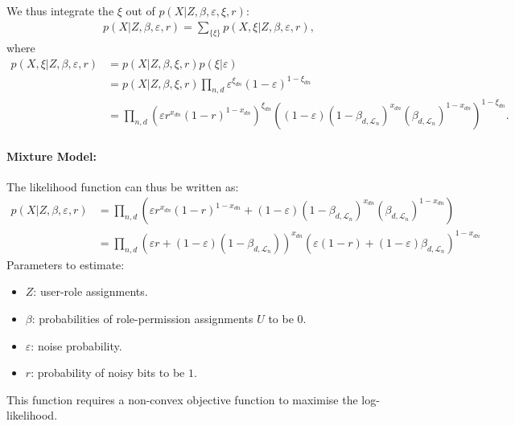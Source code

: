 We thus integrate the $\xi$ out of $p(X|Z,\beta, \varepsilon, \xi, r)$:
\begin{align*}
    p(X|Z,\beta,\varepsilon,r) = \sum_{\{\xi\}} p(X,\xi|Z,\beta, \varepsilon,r),
\end{align*}
where
\begin{align*}
    p(X,\xi|Z,\beta, \varepsilon, r) &=
        p(X|Z,\beta,\xi, r)p(\xi|\varepsilon)\\
        &= p(X|Z,\beta,\xi, r)\prod_{n,d}\varepsilon^{\xi_{dn}} (1-\varepsilon)^{1-\xi_{dn}}\\
        &= \prod_{n,d} \left(\varepsilon r^{x_{dn}} (1-r)^{1-x_{dn}}\right)^{\xi_{dn}}
            \left((1-\varepsilon)(1-\beta_{d,\mathcal L_n})^{x_{dn}}(\beta_{d,\mathcal L_n})^{1-x_{dn}}\right)^{1-\xi_{dn}}.
\end{align*}

\paragraph{Mixture Model:}
The likelihood function can thus be written as:
\begin{align*}
    p(X|Z,\beta,\varepsilon,r) &=
        \prod_{n,d} \left( \varepsilon r^{x_{dn}} (1-r)^{1-x_{dn}}+(1-\varepsilon)(1-\beta_{d,\mathcal L_n})^{x_{dn}} (\beta_{d,\mathcal L_n})^{1-x_{dn}} \right)\\
        &=  \prod_{n,d} \left(\varepsilon r + (1-\varepsilon)(1-\beta_{d,\mathcal L_n})\right)^{x_{dn}}
        \left(\varepsilon (1-r)+(1-\varepsilon)\beta_{d,\mathcal L_n}\right)^{1-x_{dn}}
\end{align*}
Parameters to estimate:
\begin{itemize}
    \item $Z$: user-role assignments.
    \item $\beta$: probabilities of role-permission assignments $U$ to be $0$.
    \item $\varepsilon$: noise probability.
    \item $r$: probability of noisy bits to be $1$.
\end{itemize}

This function requires a non-convex objective function to maximise the log-likelihood.
